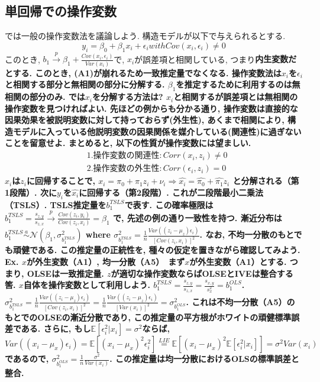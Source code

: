 \documentclass[paper=a4paper,fontsize=10pt]{jlreq}
\begin{document}
\subsection{単回帰での操作変数}
では一般の操作変数法を議論しよう. 構造モデルが以下で与えられるとする.
\begin{equation*}
  y_i = \beta_0 + \beta_1 x_i + \epsilon_i　with　Cov(x_i, \epsilon_i) \neq 0
\end{equation*}
このとき, $b_1 \overset{p}{\to} \beta_1 + \frac{Cov(x_i, \epsilon_i)}{Var(x_i)}$で, $x_i$が誤差項と相関している, つまり\rmfamily\mcfamily\bfseries{内生変数}\mdseries だとする. このとき, (A1)が崩れるため一致推定量でなくなる. 操作変数法は$x_i$を$\epsilon_i$と相関する部分と無相関の部分に分解する. $\beta_1$を推定するために利用するのは\rmfamily\mcfamily\bfseries{無相関の部分のみ}\mdseries . では$x_i$を分解する方法は? $x_i$と相関するが誤差項とは無相関の操作変数を見つければよい. 先ほどの例からも分かる通り, 操作変数は直接的な因果効果を被説明変数に対して持っておらず(外生性), あくまで相関により, 構造モデルに入っている他説明変数の因果関係を媒介している(関連性)に過ぎないことを留意せよ. まとめると, 以下の性質が操作変数には望ましい.
\begin{align*}
  &1. 操作変数の関連性:　Corr(x_i , z_i ) \neq 0\\
  &2. 操作変数の外生性:　Corr(\epsilon_i , z_i ) = 0
\end{align*}
$x_i$は$z_i$に回帰することで, $x_i = \pi_0 + \pi_1 z_i + \nu_i ⇒ \hat{x_i} = \hat{\pi_0} + \hat{\pi_1} z_i$ と分解される（第1段階）. 次に$y_i$を$\hat{x_i}$に回帰する（第2段階）. これが\rmfamily\mcfamily\bfseries{二段階最小二乗法（TSLS）}\mdseries . TSLS推定量を$b_1^{TSLS}$で表す. この確率極限は$b_1^{TSLS} = \frac{s_{z,y}}{s_{z,x}} \overset{p}{\to} \frac{Cov(z_i, y_i)}{Cov(z_i, x_i)} = \beta_1$ で, 先述の例の通り一致性を持つ. 漸近分布は$b_1^{TSLS} \overset{a}{\sim} \mathcal{N}({\beta_1}, \sigma_{b_1^{TSLS}}^2)$ where $\sigma_{b_1^{TSLS}}^2 = \frac{1}{n}\frac{Var((z_i - \mu_z)\epsilon_i)}{[Cov(z_i, x_i)]^2}$. なお, 不均一分散のもとでも頑健である. この推定量の正統性を, 種々の仮定を置きながら確認してみよう.\\

\rmfamily\mcfamily\bfseries{Ex. $x$が外生変数（A1）, 均一分散（A5）}\mdseries　まず$x$が外生変数（A1）とする. つまり, OLSEは一致推定量. $z$が適切な操作変数ならばOLSEとIVEは整合する筈. $x$自体を操作変数として利用しよう. $b_1^{TSLS} = \frac{s_{z,y}}{s_{z,x}} = \frac{s_{x,y}}{s^{2}_{x}} = b_1^{OLS}$. $\sigma_{b_1^{TSLS}}^2 = \frac{1}{n}\frac{Var((z_i - \mu_z)\epsilon_i)}{[Cov(z_i, x_i)]^2} = \frac{1}{n}\frac{Var((z_i - \mu_z)\epsilon_i)}{[Var(x_i)]^2} = \sigma_{b_1^{OLS}}^2$. これは不均一分散（A5）のもとでのOLSEの漸近分散であり, この推定量の平方根がホワイトの頑健標準誤差である. さらに, もし$\mathbb{E}[\epsilon_i^2 | x_i] = \sigma^2$ならば, $Var((x_i - \mu_x)\epsilon_i) = \mathbb{E}[(x_i - \mu_x)^2\epsilon_i^2] \overset{LIE}{=} \mathbb{E}[(x_i - \mu_x)^2\mathbb{E}[\epsilon_i^2 | x_i]] = \sigma^2 Var(x_i)$であるので, $\sigma_{b_1^{OLS}}^2 = \frac{1}{n}\frac{\sigma^2}{Var(x_i)}$. この推定量は均一分散におけるOLSの標準誤差と整合.\\
\end{document}
